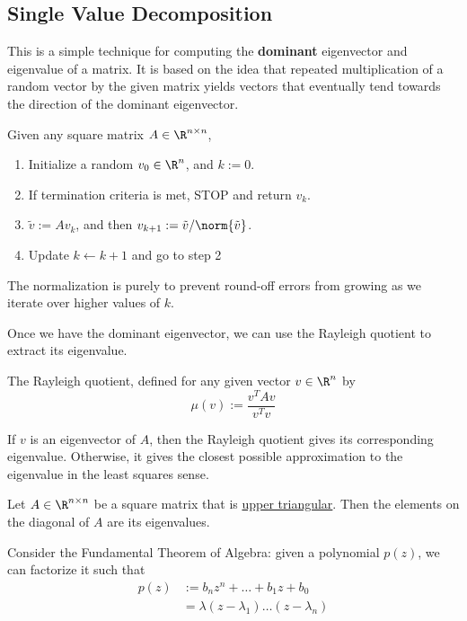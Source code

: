 \subsection{Single Value Decomposition}\label{fb30801}

\label{c63f68a}

This is a simple technique for computing the \textbf{dominant} eigenvector and
eigenvalue of a matrix. It is based on the idea that repeated multiplication of
a random vector by the given matrix yields vectors that eventually tend towards
the direction of the dominant eigenvector.

Given any square matrix $A\in\R^{n\times n}$,
\begin{enumerate}
  \item Initialize a random $v_0\in\R^n$, and $k:=0$.
  \item If termination criteria is met, STOP and return $v_k$.
  \item $\tilde v:=Av_k$, and then $v_{k+1}:=\tilde v/\norm{\tilde v}$.
  \item Update $k\gets k+1$ and go to step 2
\end{enumerate}

The normalization is purely to prevent round-off errors from growing as we
iterate over higher values of $k$.

Once we have the dominant eigenvector, we can use the Rayleigh quotient to
extract its eigenvalue.

\label{b060d88}

The Rayleigh quotient, defined for any given vector $v\in\R^n$ by
$$
  \mu(v):=\frac{v^TAv}{v^Tv}
$$

If $v$ is an eigenvector of $A$, then the Rayleigh quotient gives its
corresponding eigenvalue. Otherwise, it gives the closest possible
approximation to the eigenvalue in the least squares sense.

\label{c929b03}

Let $A\in\R^{n\times n}$ be a square matrix that is \href{c39b6bf}{upper
triangular}. Then the elements on the diagonal of $A$ are its eigenvalues.

\label{d0be039}

Consider the Fundamental Theorem of Algebra: given a polynomial $p(z)$, we can
factorize it such that
\begin{align*}
  p(z) &:=b_nz^n+\ldots+b_1z+b_0                 \\
       &=\lambda(z-\lambda_1)\ldots(z-\lambda_n)
\end{align*}

